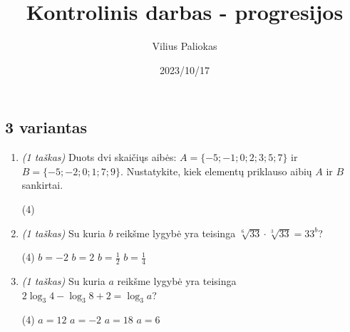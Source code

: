 \documentclass[a4paper]{article}
\title{Kontrolinis darbas - progresijos}
\author{Vilius Paliokas}
\date{2023/10/17}
\begin{document}
\thispagestyle{fancy}

\titlespacing*{\subsection}{0pt}{.75ex}{0.75ex}

\subsection*{3 variantas}

\begin{enumerate}
      \item \textit{(1 taškas)} Duots dvi skaičiųs aibės: $A=\{-5; -1; 0; 2; 3;
                  5; 7\}$ ir $B=\{-5; -2; 0; 1; 7; 9\}$. Nustatykite, kiek
            elementų priklauso aibių
            $A$ ir $B$ sankirtai.
            \begin{tasks}[item-format={\normalfont}, after-item-skip=2mm,
                        label=\Alph*, label-format={\bfseries}](4)
            \end{tasks}

      \item \textit{(1 taškas)} Su kuria $b$ reikšme lygybė yra teisinga
            $\sqrt[6]{33}\cdot\sqrt[3]{33}=33^b$?
            \begin{tasks}[item-format={\normalfont}, after-item-skip=2mm,
                        label=\Alph*, label-format={\bfseries}](4)
                  \task $b=-2$
                  \task $b=2$
                  \task $b=\frac{1}{2}$
                  \task $b=\frac{1}{4}$
            \end{tasks}

      \item \textit{(1 taškas)} Su kuria $a$ reikšme lygybė yra teisinga
            $2\log_{3} 4-\log_{3} 8 + 2= \log_{3} a$?
            \begin{tasks}[item-format={\normalfont}, after-item-skip=2mm,
                        label=\Alph*, label-format={\bfseries}](4)
                  \task $a=12$
                  \task $a=-2$
                  \task $a=18$
                  \task $a=6$
            \end{tasks}


\end{enumerate}
\end{document}

